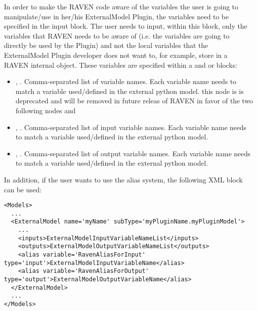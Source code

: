 In order to make the RAVEN code aware of the variables the user is going to
manipulate/use in her/his ExternalModel Plugin, the variables need to be specified
in the  input block.
%
The user needs to input, within this block, only the variables that RAVEN needs
to be aware of (i.e. the variables are going to directly be used by the Plugin)
and not the local variables that the ExternalModel Plugin developer does not want to,
for example, store in a RAVEN internal object.
%
These variables are specified within a  and   or
 blocks:
\begin{itemize}
  \item {}, .
  Comma-separated list of variable names.
  Each variable name needs to match a variable used/defined in the external python
  model. \nb this node is is deprecated and will be removed in future releas of RAVEN in
  favor of the two following nodes  and 
  \item {}, .
  Comma-separated list of input variable names.
  Each variable name needs to match a variable used/defined in the external python
  model.
  \item {}, .
  Comma-separated list of output variable names.
  Each variable name needs to match a variable used/defined in the external python
  model.
\end{itemize}

In addition, if the user wants to use the alias system, the following XML block can be used:

\begin{lstlisting}[style=XML, basicstyle=\scriptsize\ttfamily, breaklines=True, columns=fullflexible]
<Models>
  ...
  <ExternalModel name='myName' subType='myPluginName.myPluginModel'>
    ...
    <inputs>ExternalModelInputVariableNameList</inputs>
    <outputs>ExternalModelOutputVariableNameList</outputs>
    <alias variable='RavenAliasForInput' type='input'>ExternalModelInputVariableName</alias>
    <alias variable='RavenAliasForOutput' type='output'>ExternalModelOutputVariableName</alias>
  </ExternalModel>
  ...
</Models>
\end{lstlisting}

